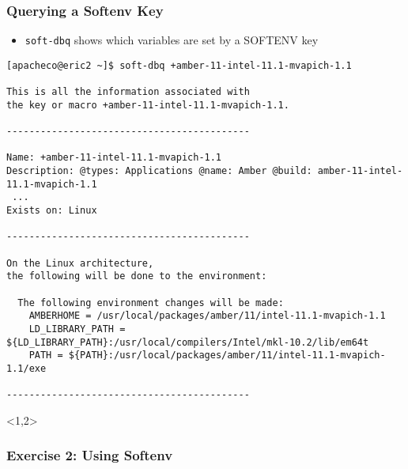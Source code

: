 \documentclass[slidestop,mathserif,compress,xcolor=svgnames,table]{beamer}
\newenvironment{eblock}[0]
{
\begin{beamerboxesrounded}[upper=uppercol2,lower=lowercol2,shadow=true]}
{\end{beamerboxesrounded}}
\begin{document}
\begin{frame}[fragile]
  \frametitle{\small Querying a Softenv Key}
  \begin{itemize}
    \item \texttt{soft-dbq} shows which variables are set by a SOFTENV key
  \end{itemize}
  {\tiny
  \vspace{-0.2cm}
  \begin{alertblock}{}
    \begin{verbatim}
[apacheco@eric2 ~]$ soft-dbq +amber-11-intel-11.1-mvapich-1.1

This is all the information associated with
the key or macro +amber-11-intel-11.1-mvapich-1.1.

-------------------------------------------

Name: +amber-11-intel-11.1-mvapich-1.1
Description: @types: Applications @name: Amber @build: amber-11-intel-11.1-mvapich-1.1
 ...
Exists on: Linux 

-------------------------------------------

On the Linux architecture,
the following will be done to the environment:

  The following environment changes will be made:
    AMBERHOME = /usr/local/packages/amber/11/intel-11.1-mvapich-1.1
    LD_LIBRARY_PATH = ${LD_LIBRARY_PATH}:/usr/local/compilers/Intel/mkl-10.2/lib/em64t
    PATH = ${PATH}:/usr/local/packages/amber/11/intel-11.1-mvapich-1.1/exe

-------------------------------------------
  \end{verbatim}
  \end{alertblock}
  }
\end{frame}

\begin{frame}<1,2>
  \frametitle{\small Exercise 2: Using Softenv}
  \begin{eblock}{ }
    \begin{itemize}
    \end{itemize}
  \end{eblock}
\end{frame}
\end{document}
